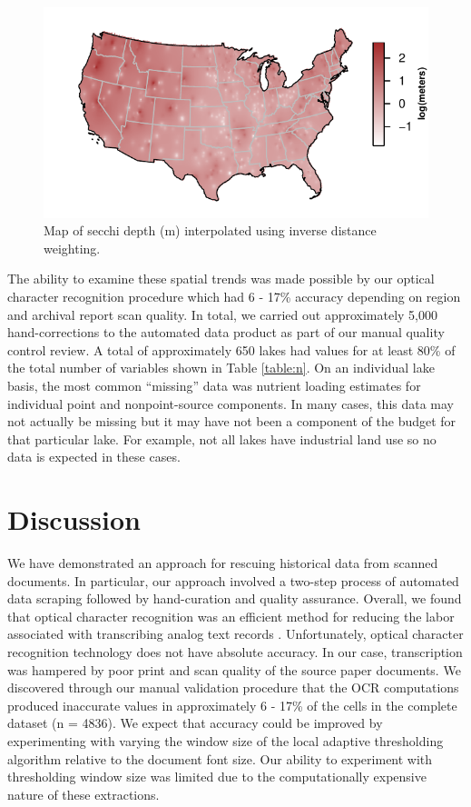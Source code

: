 \documentclass[journal abbreviations, manuscript]{copernicus}
\begin{document}
\begin{figure}[t]
  \includegraphics[width=12cm]{secchi-crop.pdf}
  \caption{Map of secchi depth (m) interpolated using inverse distance weighting.}\label{fig:secchi}
\end{figure}

The ability to examine these spatial trends was made possible by our optical character recognition procedure which had 6 - 17\% accuracy depending on region and archival report scan quality. In total, we carried out approximately 5,000 hand-corrections to the automated data product as part of our manual quality control review. A total of approximately 650 lakes had values for at least 80\% of the total number of variables shown in Table \ref{table:n}. On an individual lake basis, the most common “missing” data was nutrient loading estimates for individual point and nonpoint-source components. In many cases, this data may not actually be missing but it may have not been a component of the budget for that particular lake. For example, not all lakes have industrial land use so no data is expected in these cases.

\section{Discussion}

We have demonstrated an approach for rescuing historical data from scanned documents. In particular, our approach involved a two-step process of automated data scraping followed by hand-curation and quality assurance. Overall, we found that optical character recognition was an efficient method for reducing the labor associated with transcribing analog text records \citep{drinkwater2014use}. Unfortunately, optical character recognition technology does not have absolute accuracy. In our case, transcription was hampered by poor print and scan quality of the source paper documents. We discovered through our manual validation procedure that the OCR computations produced inaccurate values in approximately 6 - 17\% of the cells in the complete dataset (n = 4836). We expect that accuracy could be improved by experimenting with varying the window size of the local adaptive thresholding algorithm relative to the document font size. Our ability to experiment with thresholding window size was limited due to the computationally expensive nature of these extractions.
\end{document}

